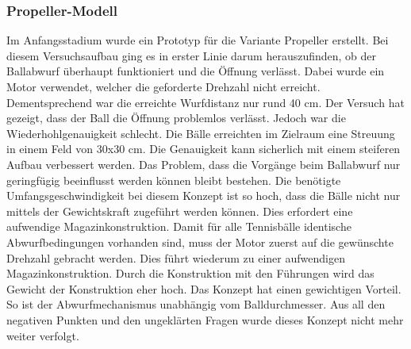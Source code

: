 \subsubsection{Propeller-Modell}
Im Anfangsstadium wurde ein Prototyp für die Variante Propeller erstellt. Bei diesem Versuchsaufbau ging es in erster Linie darum herauszufinden, ob der Ballabwurf überhaupt funktioniert und die Öffnung verlässt. Dabei wurde ein Motor verwendet, welcher die geforderte Drehzahl nicht erreicht. Dementsprechend war die erreichte Wurfdistanz nur rund 40 cm. Der Versuch hat gezeigt, dass der Ball die Öffnung problemlos verlässt. Jedoch war die Wiederhohlgenauigkeit schlecht. Die Bälle erreichten im Zielraum eine Streuung in einem Feld von 30x30 cm. Die Genauigkeit kann sicherlich mit einem steiferen Aufbau verbessert werden. Das Problem, dass die Vorgänge beim Ballabwurf nur geringfügig beeinflusst werden können bleibt bestehen. Die benötigte Umfangsgeschwindigkeit bei diesem Konzept ist so hoch, dass die Bälle nicht nur mittels der Gewichtskraft zugeführt werden können. Dies erfordert eine aufwendige Magazinkonstruktion. Damit für alle Tennisbälle identische Abwurfbedingungen vorhanden sind, muss der Motor zuerst auf die gewünschte Drehzahl gebracht werden. Dies führt wiederum zu einer aufwendigen Magazinkonstruktion. Durch die Konstruktion mit den Führungen wird das Gewicht der Konstruktion eher hoch. Das Konzept hat einen gewichtigen Vorteil. So ist der Abwurfmechanismus unabhängig vom Balldurchmesser. Aus all den negativen Punkten und den ungeklärten Fragen wurde dieses Konzept nicht mehr weiter verfolgt. 
